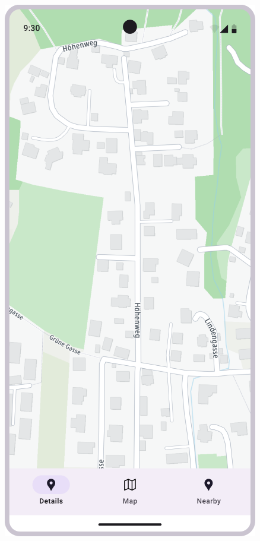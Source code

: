 \begin{figure}[H]
    \centering
    \begin{minipage}{0.3\textwidth}
        \centering
        \includegraphics[width=\textwidth]{images/paul/wireframes/mapScreen.png}

\end{minipage}
\end{figure}
